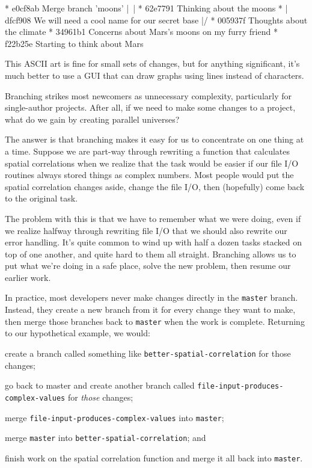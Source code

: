 \documentclass{book}
\begin{document}

\begin{VerbOut}
*   e0cf8ab Merge branch 'moons'
|\
| * 62e7791 Thinking about the moons
* | dfcf908 We will need a cool name for our secret base
|/
* 005937f Thoughts about the climate
* 34961b1 Concerns about Mars's moons on my furry friend
* f22b25e Starting to think about Mars
\end{VerbOut}

This ASCII art is fine for small sets of changes, but for anything
significant, it's much better to use a GUI that can draw graphs using
lines instead of characters.

Branching strikes most newcomers as unnecessary complexity, particularly
for single-author projects. After all, if we need to make some changes
to a project, what do we gain by creating parallel universes?

The answer is that branching makes it easy for us to concentrate on one
thing at a time. Suppose we are part-way through rewriting a function
that calculates spatial correlations when we realize that the task would
be easier if our file I/O routines always stored things as complex
numbers. Most people would put the spatial correlation changes aside,
change the file I/O, then (hopefully) come back to the original task.

The problem with this is that we have to remember what we were doing,
even if we realize halfway through rewriting file I/O that we should
also rewrite our error handling. It's quite common to wind up with half
a dozen tasks stacked on top of one another, and quite hard to them all
straight. Branching allows us to put what we're doing in a safe place,
solve the new problem, then resume our earlier work.

In practice, most developers never make changes directly in the
\texttt{master} branch. Instead, they create a new branch from it for
every change they want to make, then merge those branches back to
\texttt{master} when the work is complete. Returning to our hypothetical
example, we would:

\begin{swcenumerate}
\item
  create a branch called something like
  \texttt{better-spatial-correlation} for those changes;
\item
  go back to master and create another branch called
  \texttt{file-input-produces-complex-values} for \emph{those} changes;
\item
  merge \texttt{file-input-produces-complex-values} into
  \texttt{master};
\item
  merge \texttt{master} into \texttt{better-spatial-correlation}; and
\item
  finish work on the spatial correlation function and merge it all back
  into \texttt{master}.
\end{swcenumerate}
\end{document}
